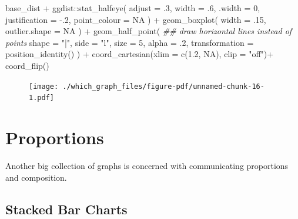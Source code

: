 \documentclass[
  letterpaper,
]{book}
\newenvironment{Shaded}{\begin{snugshade}}{\end{snugshade}}
\newcommand{\AttributeTok}[1]{\textcolor[rgb]{0.40,0.45,0.13}{#1}}
\newcommand{\ConstantTok}[1]{\textcolor[rgb]{0.56,0.35,0.01}{#1}}
\newcommand{\DecValTok}[1]{\textcolor[rgb]{0.68,0.00,0.00}{#1}}
\newcommand{\DocumentationTok}[1]{\textcolor[rgb]{0.37,0.37,0.37}{\textit{#1}}}
\newcommand{\FloatTok}[1]{\textcolor[rgb]{0.68,0.00,0.00}{#1}}
\newcommand{\FunctionTok}[1]{\textcolor[rgb]{0.28,0.35,0.67}{#1}}
\newcommand{\NormalTok}[1]{\textcolor[rgb]{0.00,0.23,0.31}{#1}}
\newcommand{\SpecialCharTok}[1]{\textcolor[rgb]{0.37,0.37,0.37}{#1}}
\newcommand{\StringTok}[1]{\textcolor[rgb]{0.13,0.47,0.30}{#1}}
\begin{document}
\begin{Shaded}
\begin{Highlighting}[]
\NormalTok{base\_dist }\SpecialCharTok{+}
\NormalTok{  ggdist}\SpecialCharTok{::}\FunctionTok{stat\_halfeye}\NormalTok{(}
    \AttributeTok{adjust =}\NormalTok{ .}\DecValTok{3}\NormalTok{, }
    \AttributeTok{width =}\NormalTok{ .}\DecValTok{6}\NormalTok{, }
    \AttributeTok{.width =} \DecValTok{0}\NormalTok{, }
    \AttributeTok{justification =} \SpecialCharTok{{-}}\NormalTok{.}\DecValTok{2}\NormalTok{, }
    \AttributeTok{point\_colour =} \ConstantTok{NA}
\NormalTok{  ) }\SpecialCharTok{+} 
  \FunctionTok{geom\_boxplot}\NormalTok{(}
    \AttributeTok{width =}\NormalTok{ .}\DecValTok{15}\NormalTok{, }
    \AttributeTok{outlier.shape =} \ConstantTok{NA}
\NormalTok{  ) }\SpecialCharTok{+}
  \FunctionTok{geom\_half\_point}\NormalTok{(}
    \DocumentationTok{\#\# draw horizontal lines instead of points}
    \AttributeTok{shape =} \StringTok{"|"}\NormalTok{,}
    \AttributeTok{side =} \StringTok{"l"}\NormalTok{,}
    \AttributeTok{size =} \DecValTok{5}\NormalTok{,}
    \AttributeTok{alpha =}\NormalTok{ .}\DecValTok{2}\NormalTok{,}
    \AttributeTok{transformation =} \FunctionTok{position\_identity}\NormalTok{()}
\NormalTok{  ) }\SpecialCharTok{+}
  \FunctionTok{coord\_cartesian}\NormalTok{(}\AttributeTok{xlim =} \FunctionTok{c}\NormalTok{(}\FloatTok{1.2}\NormalTok{, }\ConstantTok{NA}\NormalTok{), }\AttributeTok{clip =} \StringTok{"off"}\NormalTok{)}\SpecialCharTok{+} \FunctionTok{coord\_flip}\NormalTok{()}
\end{Highlighting}
\end{Shaded}

\begin{figure}[H]

{\centering \texttt{[image: ./which\_graph\_files/figure-pdf/unnamed-chunk-16-1.pdf]}

}

\end{figure}

\hypertarget{proportions}{%
\section{Proportions}\label{proportions}}

Another big collection of graphs is concerned with communicating
proportions and composition.

\hypertarget{stacked-bar-charts}{%
\subsection{Stacked Bar Charts}\label{stacked-bar-charts}}
\end{document}
